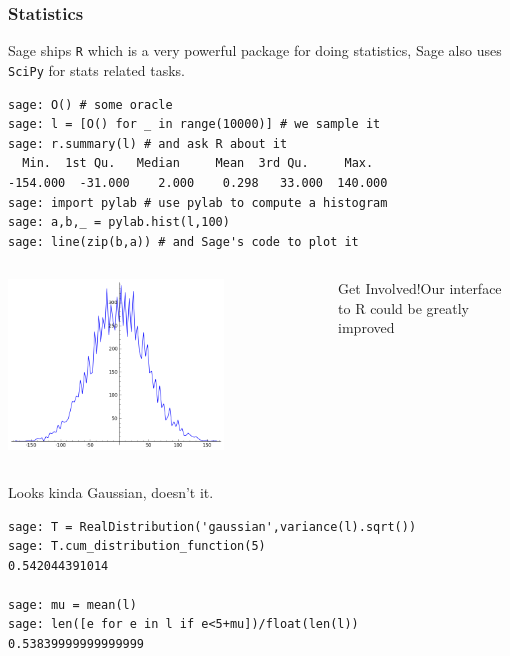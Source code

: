 \documentclass[10pt]{beamer}
\newcommand{\getinvolved}[1]{\begin{block}{Get Involved!}#1\end{block}}
\begin{document}
\begin{frame}
\frametitle{Statistics}
Sage ships {\tt R} which is a very powerful package for doing statistics, Sage also uses {\tt SciPy} for stats related tasks.

\begin{lstlisting}
sage: O() # some oracle
sage: l = [O() for _ in range(10000)] # we sample it
sage: r.summary(l) # and ask R about it
  Min.  1st Qu.   Median     Mean  3rd Qu.     Max.
-154.000  -31.000    2.000    0.298   33.000  140.000
sage: import pylab # use pylab to compute a histogram
sage: a,b,_ = pylab.hist(l,100)
sage: line(zip(b,a)) # and Sage's code to plot it
\end{lstlisting}

\begin{columns}
\centering
\includegraphics[width=0.7\textwidth]{gaussian.png}
\getinvolved{Our interface to R could be greatly improved}
\end{columns}

\framebreak

Looks kinda Gaussian, doesn't it.

\begin{lstlisting}
sage: T = RealDistribution('gaussian',variance(l).sqrt())
sage: T.cum_distribution_function(5)
0.542044391014

sage: mu = mean(l)
sage: len([e for e in l if e<5+mu])/float(len(l))
0.53839999999999999
\end{lstlisting}

\end{frame}
\end{document}
